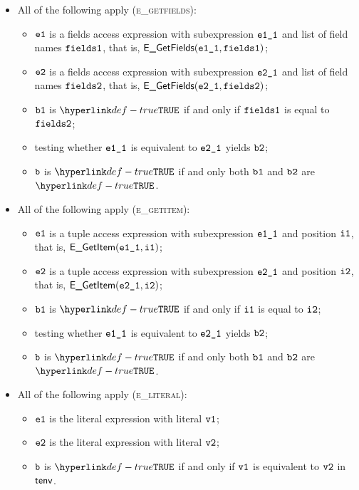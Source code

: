 \documentclass{book}
\newcommand\ProseOrTypeError[0]{\ProseTerminateAs{\TypeErrorConfig}}
\begin{document}
\begin{itemize}
  \item All of the following apply (\textsc{e\_getfields}):
  \begin{itemize}
    \item $\texttt{e1}$ is a fields access expression with subexpression $\texttt{e1\_1}$ and list of field names $\texttt{fields1}$,
          that is, $\textsf{E\_GetFields}(\texttt{e1\_1}, \texttt{fields1})$;
    \item $\texttt{e2}$ is a fields access expression with subexpression $\texttt{e2\_1}$ and list of field names $\texttt{fields2}$,
          that is, $\textsf{E\_GetFields}(\texttt{e2\_1}, \texttt{fields2})$;
    \item $\texttt{b1}$ is $\True$ if and only if $\texttt{fields1}$ is equal to $\texttt{fields2}$;
    \item testing whether $\texttt{e1\_1}$ is equivalent to $\texttt{e2\_1}$ yields $\texttt{b2}$\ProseOrTypeError;
    \item $\texttt{b}$ is $\True$ if and only both $\texttt{b1}$ and $\texttt{b2}$ are $\True$.
  \end{itemize}

  \item All of the following apply (\textsc{e\_getitem}):
  \begin{itemize}
    \item $\texttt{e1}$ is a tuple access expression with subexpression $\texttt{e1\_1}$ and position $\texttt{i1}$,
          that is, $\textsf{E\_GetItem}(\texttt{e1\_1}, \texttt{i1})$;
    \item $\texttt{e2}$ is a tuple access expression with subexpression $\texttt{e2\_1}$ and position $\texttt{i2}$,
          that is, $\textsf{E\_GetItem}(\texttt{e2\_1}, \texttt{i2})$;
    \item $\texttt{b1}$ is $\True$ if and only if $\texttt{i1}$ is equal to $\texttt{i2}$;
    \item testing whether $\texttt{e1\_1}$ is equivalent to $\texttt{e2\_1}$ yields $\texttt{b2}$\ProseOrTypeError;
    \item $\texttt{b}$ is $\True$ if and only both $\texttt{b1}$ and $\texttt{b2}$ are $\True$.
  \end{itemize}

  \item All of the following apply (\textsc{e\_literal}):
  \begin{itemize}
    \item $\texttt{e1}$ is the literal expression with literal $\texttt{v1}$;
    \item $\texttt{e2}$ is the literal expression with literal $\texttt{v2}$;
    \item $\texttt{b}$ is $\True$ if and only if $\texttt{v1}$ is equivalent to $\texttt{v2}$ in $\textsf{tenv}$.
  \end{itemize}


\end{itemize}
\end{document}
